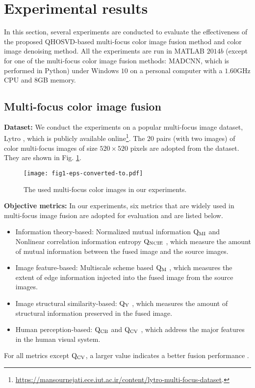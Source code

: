 \documentclass[journal]{IEEEtran}
\begin{document}
\section{Experimental results}
\label{exresults}
In this section, several experiments are conducted to evaluate the effectiveness of the  proposed QHOSVD-based multi-focus color image fusion method and color image denoising method. All the experiments  are run in MATLAB $2014b$ (except for one of the multi-focus color image fusion methods: MADCNN, which is performed in Python) under Windows $10$ on a personal computer with a $1.60$GHz CPU and $8$GB memory.


\subsection{Multi-focus color image fusion}
\textbf{Dataset:} We conduct the experiments on a popular multi-focus image dataset, Lytro \cite{DBLP:journals/inffus/NejatiSS15}, which is publicly available online\footnote{\url{https://mansournejati.ece.iut.ac.ir/content/lytro-multi-focus-dataset}.}. The $20$ pairs (with two images) of color multi-focus images of size $520\times 520$ pixels are adopted from the dataset. They are shown in Fig. \ref{fig1}.
\begin{figure}[htbp]
	\centering
	\texttt{[image: fig1-eps-converted-to.pdf]}
	\caption{The used multi-focus color images in our experiments.}
	\label{fig1}
\end{figure}

\textbf{Objective metrics:} In our experiments, six metrics that are widely used in multi-focus image fusion are adopted for evaluation and are listed below.  
\begin{itemize}
\item Information theory-based: Normalized mutual information $\rm{Q_{MI}}$ \cite{2008Comments} and Nonlinear correlation information entropy $\rm{Q_{NCIE}}$ \cite{Wang2005A}, which measure the amount of mutual information between the fused image and the source images.
\item Image feature-based: Multiscale scheme based $\rm{Q_{M}}$ \cite{2008A}, which measures the extent of edge information injected into the fused image from the source
images. 
\item Image structural similarity-based: $\rm{Q_{Y}}$ \cite{2008A}, which measures the amount of structural information preserved in the fused image.
\item Human perception-based: $\rm{Q_{CB}}$ \cite{DBLP:journals/ivc/ChenB09} and $\rm{Q_{CV}}$ \cite{DBLP:journals/inffus/ChenV07}, which address the major features in the human visual system.
\end{itemize}
For all metrics except $\rm{Q_{CV}}$, a larger value indicates a better fusion performance \cite{DBLP:journals/pami/LiuBXZLW12,DBLP:journals/inffus/LiuWCLC20}.	
\end{document}
